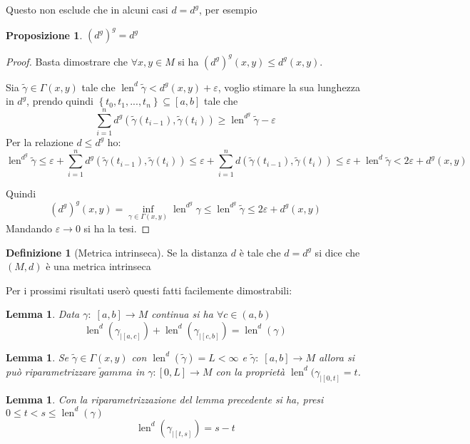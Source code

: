 \documentclass[a4paper,10pt]{article}
\newcounter{counter1}
\theoremstyle{plain}
\newtheorem{mylem}[counter1]{Lemma}
\newtheorem{mypro}[counter1]{Proposizione}
\theoremstyle{definition}
\newtheorem{mydef}[counter1]{Definizione}
\theoremstyle{remark}
\newcommand{\set}[1]{\left\{#1\right\}}
\newcommand{\pa}[1]{\left(#1\right)}
\newcommand{\bra}[1]{\left[#1\right]}
\DeclareMathOperator{\len}{len}
\begin{document}
Questo non esclude che in alcuni casi $d = d^g$, per esempio
\begin{mypro}
  $\pa{d^g}^g = d^g$
\end{mypro}
\begin{proof}
  Basta dimostrare che $\forall x,y \in M$ si ha $\pa{d^g}^g(x,y) \le
  d^g(x,y)$.

  Sia $\tilde\gamma \in \Gamma(x,y)$ tale che $\len ^d \tilde\gamma <
  d^g(x,y) + \varepsilon$, voglio stimare la sua lunghezza in $d^g$,
  prendo quindi $\set{t_0,t_1,...,t_n} \subseteq \bra{a,b}$ tale che
  \[ \sum _{i=1} ^n d^g(\tilde\gamma(t_{i-1}),\tilde\gamma(t_i)) \ge
  \len ^{d^g} \tilde\gamma - \varepsilon \] Per la relazione $d\le
  d^g$ ho:
  \[ \len ^{d^g} \tilde\gamma \le \varepsilon + \sum _{i=1} ^n
  d^g(\tilde\gamma(t_{i-1}),\tilde\gamma(t_i)) \le \varepsilon + \sum
  _{i=1} ^n d(\tilde\gamma(t_{i-1}),\tilde\gamma(t_i)) \le \varepsilon
  + \len ^d \tilde\gamma < 2 \varepsilon + d^g(x,y) \]

  Quindi
  \[ \pa{d^g}^g (x,y) = \inf _{\gamma \in \Gamma(x,y)} \len ^{d^g}
  \gamma \le \len ^{d^g} \tilde\gamma \le 2 \varepsilon + d^g(x,y) \]
  Mandando $\varepsilon \to 0$ si ha la tesi.
\end{proof}

\begin{mydef}[Metrica intrinseca]
  Se la distanza $d$ è tale che $d = d^g$ si dice che $(M,d)$ è una
  metrica intrinseca
\end{mydef}

Per i prossimi risultati userò questi fatti facilemente dimostrabili:
\begin{mylem}
  Data $\gamma:\; \bra{a,b} \to M$ continua si ha $\forall c \in
  \pa{a,b}$
  \[ \len ^d (\gamma_{|\bra{a,c}}) +  \len ^d (\gamma_{|\bra{c,b}}) = 
  \len ^d (\gamma) \] 
\end{mylem}
\begin{mylem}
  Se $\tilde \gamma \in \Gamma (x,y)$ con $\len ^d (\tilde \gamma) = L
  < \infty$ e $\tilde \gamma : \; \bra {a,b} \to M$ allora si può
  riparametrizzare $\tilde gamma$ in $\gamma : \bra{0,L} \to M$ con la
  proprietà $\len ^d(\gamma_{| \bra{0,t}} = t$.
\end{mylem}
\begin{mylem}
  Con la riparametrizzazione del lemma precedente si ha, presi $0 \le
  t < s \le \len ^d (\gamma)$
  \[ \len ^d (\gamma _{|\bra{t,s}}) = s - t \]
\end{mylem}
\end{document}
